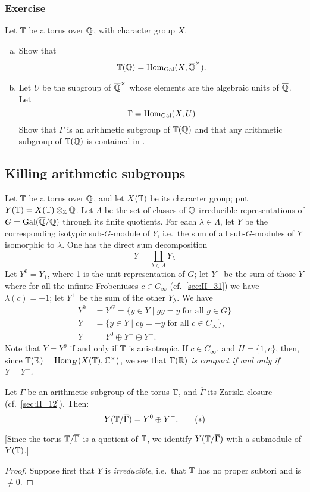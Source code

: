 \begin{subappendices}
\subsubsection*{Exercise}
\dpage
Let $\mathbb{T}$ be a torus over $\mathbb{Q}$, with character group $X$.
\begin{enumerate}[a)]
\item Show that
	\[
		\mathbb{T}(\mathbb{Q}) = \operatorname{Hom}_{\operatorname{Gal}} (X, \overline{\mathbb{Q}}^\times).
	\]
\item Let $U$ be the subgroup of $\overline{\mathbb{Q}}^\times$ whose elements are the 
algebraic units of $\overline{\mathbb{Q}}$. Let
\[
	\Gamma = \operatorname{Hom}_{\operatorname{Gal}}(X, U)
\]
Show that $\Gamma$ is an arithmetic subgroup of $\mathbb{T}(\mathbb{Q})$ and that any 
arithmetic subgroup of $\mathbb{T}(\mathbb{Q})$ is contained in \TT.
\end{enumerate}

\subsection{Killing arithmetic subgroups}
\label{sec:II_A2}
Let $\mathbb{T}$ be a torus over $\mathbb{Q}$, and let $X(\mathbb{T})$ be its character group; put
$Y(\mathbb{T}) = X(\mathbb{T}) \otimes_{\mathbb{Z}} \mathbb{Q}$. Let $\Lambda$ be the set of classes of
$\mathbb{Q}$-irreducible representations of $G = \operatorname{Gal}(\overline{\mathbb{Q}}/\mathbb{Q})$ through its finite
quotients. For each $\lambda \in \Lambda$, let $Y$ be the corresponding
isotypic sub-$G$-module of $Y$, i.e.\ the sum of all sub-$G$-modules of $Y$
isomorphic to $\lambda$. One has the direct sum decomposition
\[
	Y = \coprod_{\lambda \in \Lambda} Y_\lambda
\]
Let $Y^0 = Y_1$, where 1 is the unit representation of $G$; let $Y^-$ be the
sum of those $Y$ where for all the infinite Frobeniuses $c \in C_\infty$
(cf.\ \ref{sec:II_31}) we have $\lambda(c) = -1$; let $Y^+$ be the sum of the
other $Y_\lambda$.  We have
\dpage
\begin{align*}
	Y^0 &= Y^G = \{ y \in Y \mid gy = y \; \text{for all } g\in G \} \\
	Y^- &= \{ y \in Y \mid cy = -y \; \text{for all } c\in C_\infty \}, \\
	Y   &= Y^0 \oplus Y^- \oplus Y^+.
\end{align*}
Note that $Y = Y^0$ if and only if $\mathbb{T}$ is anisotropic.  If $c \in C_\infty$,
and $H = \{ 1, c \}$, then, since $\mathbb{T}(\mathbb{R}) = \operatorname{Hom}_H(X(\mathbb{T}),\mathbb{C}^\times)$, we see
that \emph{$\mathbb{T}(\mathbb{R})$ is compact if and only if $Y = Y^-$.}

\begin{prop}
	Let $\Gamma$ be an arithmetic subgroup of the torus $\mathbb{T}$,
	and $\overline{\Gamma}$ its Zariski closure (cf.\ \ref{sec:II_12}). Then:
	\begin{equation}
		Y(\mathbb{T}/\overline{\Gamma}) = Y^0 \oplus Y^-.
		\tag{$*$}
		\label{eqn:II_A2_star}
	\end{equation}
\end{prop}
{[Since the torus $\mathbb{T}/\overline{\Gamma}$ is a quotient of $\mathbb{T}$, we identify
$Y(\mathbb{T}/\overline{\Gamma})$ with a submodule of $Y(\mathbb{T})$.]}
\begin{proof}
	Suppose first that $Y$ is \emph{irreducible}, i.e.\ that $\mathbb{T}$ has no
	proper subtori and is $\ne 0$.


\end{proof}
\end{subappendices}
